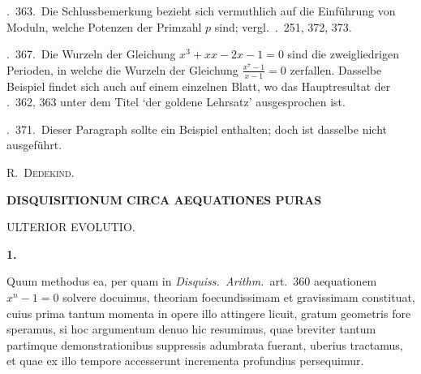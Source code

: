 \textsection.\ 363.\ Die Schlussbemerkung bezieht sich vermuthlich auf die Einführung von Moduln, welche Potenzen der Primzahl $p$ sind; vergl.\ \textsection\textsection.\ 251, 372, 373.

\textsection.\ 367.\ Die Wurzeln der Gleichung $x^3+xx-2x-1=0$ sind die zweigliedrigen Perioden, in welche die Wurzeln der Gleichung $\frac{x^7-1}{x-1}=0$ zerfallen. Dasselbe Beispiel findet sich auch auf einem einzelnen Blatt, wo das Hauptresultat der \textsection\textsection.\ 362, 363 unter dem Titel `der goldene Lehrsatz' ausgesprochen ist.

\textsection.\ 371.\ Dieser Paragraph sollte ein Beispiel enthalten; doch ist dasselbe nicht ausgeführt.
\begin{flushright}R.\ \textsc{Dedekind}.\end{flushright}

%
\par\bigskip{}
\begin{center}\large\bfseries DISQUISITIONUM CIRCA AEQUATIONES PURAS\par\medskip ULTERIOR EVOLUTIO.\end{center}
\renewcommand{\BookRunningTitle}{Nachlass. Disquisitionum circa aequationes puras}
\renewcommand{\Article}[1]{\par\medskip\Needspace{4\baselineskip}\pdfbookmark[1]{Art. #1}{purae-art-#1}\centerline{\textbf{#1.}}\nobreak\smallskip}

\Article{1}
Quum methodus ea, per quam in \emph{Disquiss.\ Arithm.}\ art.\ 360 aequationem $x^n-1=0$ solvere docuimus, theoriam foecundissimam et gravissimam constituat, cuius prima tantum momenta in opere illo attingere licuit, gratum geometris fore speramus, si hoc argumentum denuo hic resumimus, quae breviter tantum partimque demonstrationibus suppressis adumbrata fuerant, uberius tractamus, et quae ex illo tempore accesserunt incrementa profundius persequimur.

